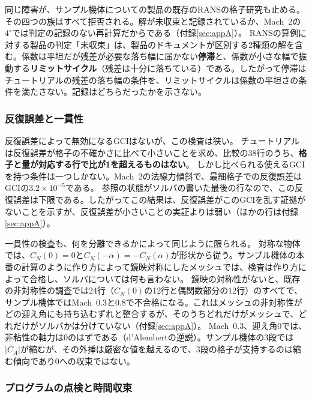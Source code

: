 \documentclass[twocolumn]{labreport}
\begin{document}
同じ障害が、サンプル機体についての製品の既存のRANSの格子研究も止める。その四つの族はすべて拒否される。解が未収束と記録されているか、Mach~2の$4^\circ$では判定の記録のない再計算だからである（付録\ref{sec:appA}）。
RANSの算例に対する製品の判定「未収束」は、製品のドキュメントが区別する2種類の解を含む。係数は平坦だが残差が必要な落ち幅に届かない\textbf{停滞}と、係数が小さな幅で振動する\textbf{リミットサイクル}（残差は十分に落ちている）である。したがって停滞はチュートリアルの残差の落ち幅の条件を、リミットサイクルは係数の平坦さの条件を満たさない。記録はどちらだったかを示さない。

\subsubsection{反復誤差と一貫性}
\label{sec:iter}
\label{sec:consistency}

反復誤差によって無効になるGCIはないが、この検査は狭い。
チュートリアルは反復誤差が格子の不確かさに比べて小さいことを求め、比較の38行のうち、\textbf{格子と量が対応する行で比が1を超えるものはない}。
しかし比べられる使えるGCIを持つ条件は一つしかない。Mach~2の法線力傾斜で、最細格子での反復誤差はGCIの$3.2\times10^{-5}$である。
参照の状態がソルバの書いた最後の行なので、この反復誤差は下限である。したがってこの結果は、反復誤差がこのGCIを乱す証拠がないことを示すが、反復誤差が小さいことの実証よりは弱い（ほかの行は付録\ref{sec:appA}）。

一貫性の検査も、何を分離できるかによって同じように限られる。
対称な物体では、$C_N(0)=0$と$C_N(-\alpha)=-C_N(\alpha)$が形状から従う。サンプル機体の本番の計算のように作り方によって鏡映対称にしたメッシュでは、検査は作り方によって合格し、ソルバについては何も言わない。
鏡映の対称性がないと、既存の非対称性の調査では24行（$C_N(0)$の12行と偶関数部分の12行）のすべてで、サンプル機体ではMach~0.3と0.8で不合格になる。これはメッシュの非対称性がどの迎え角にも持ち込むずれと整合するが、そのうちどれだけがメッシュで、どれだけがソルバかは分けていない（付録\ref{sec:appA}）。
Mach~0.3、迎え角0では、非粘性の軸力は0のはずである（d'Alembertの逆説）。サンプル機体の3段では$|C_A|$が縮むが、その外挿は厳密な値を越えるので、3段の格子が支持するのは縮む傾向であり0への収束ではない。

\subsubsection{プログラムの点検と時間収束}
\label{sec:step1}
\label{sec:temporal}
\end{document}
